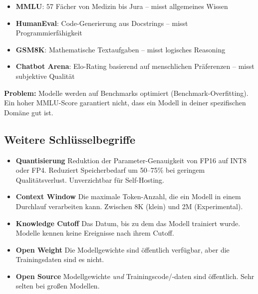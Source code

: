 \begin{itemize}[leftmargin=*]
    \item \textbf{MMLU}: 57 Fächer von Medizin bis Jura -- misst allgemeines Wissen
    \item \textbf{HumanEval}: Code-Generierung aus Docstrings -- misst Programmierfähigkeit
    \item \textbf{GSM8K}: Mathematische Textaufgaben -- misst logisches Reasoning
    \item \textbf{Chatbot Arena}: Elo-Rating basierend auf menschlichen Präferenzen -- misst subjektive Qualität
\end{itemize}

\textbf{Problem:} Modelle werden auf Benchmarks optimiert (Benchmark-Overfitting). Ein hoher MMLU-Score garantiert nicht, dass ein Modell in deiner spezifischen Domäne gut ist.

\subsection{Weitere Schlüsselbegriffe}

\begin{itemize}

    \item \textbf{Quantisierung} Reduktion der Parameter-Genauigkeit von FP16 auf INT8 oder FP4. Reduziert Speicherbedarf um 50--75\% bei geringem Qualitätsverlust. Unverzichtbar für Self-Hosting.
    \item \textbf{Context Window} Die maximale Token-Anzahl, die ein Modell in einem Durchlauf verarbeiten kann. Zwischen 8K (klein) und 2M (Experimental).
    \item \textbf{Knowledge Cutoff} Das Datum, bis zu dem das Modell trainiert wurde. Modelle kennen keine Ereignisse nach ihrem Cutoff.
    \item \textbf{Open Weight} Die Modellgewichte sind öffentlich verfügbar, aber die Trainingsdaten sind es nicht.
    \item \textbf{Open Source} Modellgewichte \textit{und} Trainingscode/-daten sind öffentlich. Sehr selten bei großen Modellen.
\end{itemize}


